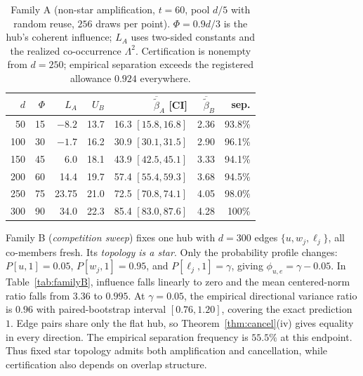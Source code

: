 \documentclass[preprint,11pt]{elsarticle}
\begin{document}
\begin{table}[htbp]
\centering\small
\begin{tabular}{rrrrrrr}
\toprule
$d$ & $\Phi$ & $L_A$ & $U_B$ & $\overline{\widetilde\beta}_A$ [CI] &
$\overline{\widetilde\beta}_B$ & sep.\\
\midrule
50 & 15 & $-8.2$ & 13.7 & 16.3 $[15.8,16.8]$ & 2.36 & 93.8\%\\
100 & 30 & $-1.7$ & 16.2 & 30.9 $[30.1,31.5]$ & 2.90 & 96.1\%\\
150 & 45 & 6.0 & 18.1 & 43.9 $[42.5,45.1]$ & 3.33 & 94.1\%\\
200 & 60 & 14.4 & 19.7 & 57.4 $[55.4,59.3]$ & 3.68 & 94.5\%\\
250 & 75 & 23.75 & 21.0 & 72.5 $[70.8,74.1]$ & 4.05 & 98.0\%\\
300 & 90 & 34.0 & 22.3 & 85.4 $[83.0,87.6]$ & 4.28 & 100\%\\
\bottomrule
\end{tabular}
\caption{Family A (non-star amplification, $t{=}60$, pool $d/5$ with
random reuse, $256$ draws per point). $\Phi=0.9d/3$ is the hub's
coherent influence; $L_A$ uses two-sided constants and the realized
co-occurrence $\Lambda^2$.
Certification is nonempty from $d=250$; empirical separation exceeds
the registered allowance $0.924$ everywhere.}
\label{tab:familyA}
\end{table}

Family B (\emph{competition sweep}) fixes one hub with $d=300$ edges
$\{u,w_j,\ell_j\}$, all co-members fresh. Its \emph{topology is a
star}. Only the probability profile changes: $P[u,1]=0.05$,
$P[w_j,1]=0.95$, and $P[\ell_j,1]=\gamma$, giving
$\phi_{u,e}=\gamma-0.05$. In Table~\ref{tab:familyB}, influence
falls linearly to zero and the mean centered-norm ratio falls
from $3.36$ to $0.995$. At $\gamma=0.05$, the empirical directional
variance ratio is $0.96$ with paired-bootstrap interval $[0.76,1.20]$,
covering the exact prediction $1$. Edge pairs share only the flat
hub, so Theorem~\ref{thm:cancel}(iv) gives equality in every
direction. The empirical separation frequency is $55.5\%$ at this
endpoint. Thus fixed star topology admits both amplification and
cancellation, while certification also depends on overlap structure.
\end{document}
